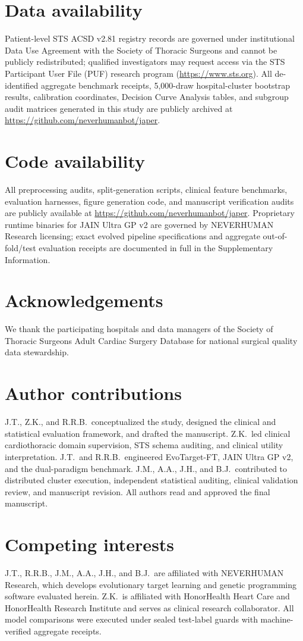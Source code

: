 \section*{Data availability}
Patient-level STS ACSD v2.81 registry records are governed under institutional Data Use Agreement with the Society of Thoracic Surgeons and cannot be publicly redistributed; qualified investigators may request access via the STS Participant User File (PUF) research program (\url{https://www.sts.org}). All de-identified aggregate benchmark receipts, 5,000-draw hospital-cluster bootstrap results, calibration coordinates, Decision Curve Analysis tables, and subgroup audit matrices generated in this study are publicly archived at \url{https://github.com/neverhumanbot/japer}.

\section*{Code availability}
All preprocessing audits, split-generation scripts, clinical feature benchmarks, evaluation harnesses, figure generation code, and manuscript verification audits are publicly available at \url{https://github.com/neverhumanbot/japer}. Proprietary runtime binaries for JAIN Ultra GP v2 are governed by NEVERHUMAN Research licensing; exact evolved pipeline specifications and aggregate out-of-fold/test evaluation receipts are documented in full in the Supplementary Information.

\section*{Acknowledgements}
We thank the participating hospitals and data managers of the Society of Thoracic Surgeons Adult Cardiac Surgery Database for national surgical quality data stewardship.

\section*{Author contributions}
J.T., Z.K., and R.R.B.\ conceptualized the study, designed the clinical and statistical evaluation framework, and drafted the manuscript. Z.K.\ led clinical cardiothoracic domain supervision, STS schema auditing, and clinical utility interpretation. J.T.\ and R.R.B.\ engineered EvoTarget-FT, JAIN Ultra GP v2, and the dual-paradigm benchmark. J.M., A.A., J.H., and B.J.\ contributed to distributed cluster execution, independent statistical auditing, clinical validation review, and manuscript revision. All authors read and approved the final manuscript.

\section*{Competing interests}
J.T., R.R.B., J.M., A.A., J.H., and B.J.\ are affiliated with NEVERHUMAN Research, which develops evolutionary target learning and genetic programming software evaluated herein. Z.K.\ is affiliated with HonorHealth Heart Care and HonorHealth Research Institute and serves as clinical research collaborator. All model comparisons were executed under sealed test-label guards with machine-verified aggregate receipts.
